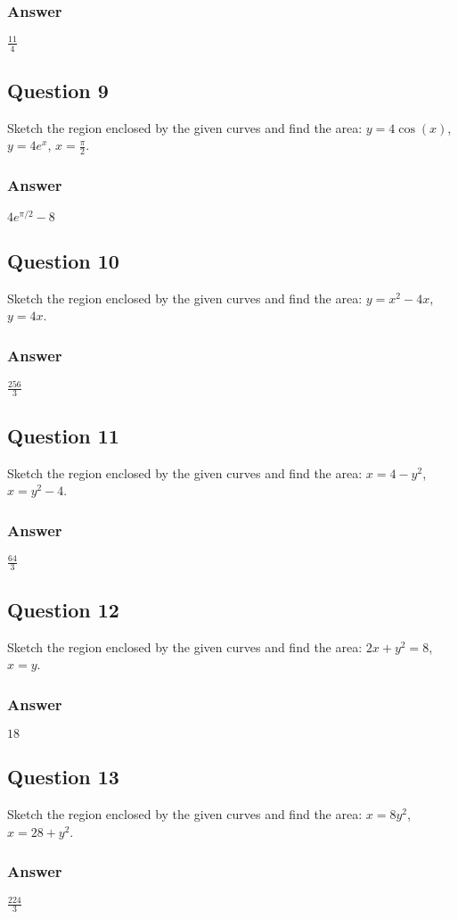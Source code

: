 \documentclass{article}
\begin{document}
\subsubsection*{Answer}
$ \frac{11}{4} $

\subsection*{Question 9}
Sketch the region enclosed by the given curves and find the area: $y=4\cos(x)$, $y=4e^x$, $x=\frac{\pi}{2}$.
\subsubsection*{Answer}
$ 4e^{\pi/2} - 8 $

\subsection*{Question 10}
Sketch the region enclosed by the given curves and find the area: $y=x^2-4x$, $y=4x$.
\subsubsection*{Answer}
$ \frac{256}{3} $

\subsection*{Question 11}
Sketch the region enclosed by the given curves and find the area: $x=4-y^2$, $x=y^2-4$.
\subsubsection*{Answer}
$ \frac{64}{3} $

\subsection*{Question 12}
Sketch the region enclosed by the given curves and find the area: $2x+y^2=8$, $x=y$.
\subsubsection*{Answer}
$ 18 $

\subsection*{Question 13}
Sketch the region enclosed by the given curves and find the area: $x=8y^2$, $x=28+y^2$.
\subsubsection*{Answer}
$ \frac{224}{3} $
\end{document}
